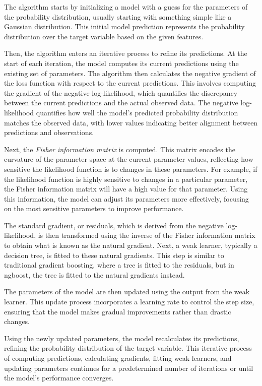 The algorithm starts by initializing a model with a guess for the parameters of the probability distribution, usually starting with something simple like a Gaussian distribution.
This initial model prediction represents the probability distribution over the target variable based on the given features.

Then, the algorithm enters an iterative process to refine its predictions.
At the start of each iteration, the model computes its current predictions using the existing set of parameters.
The algorithm then calculates the negative gradient of the loss function with respect to the current predictions.
This involves computing the gradient of the negative log-likelihood, which quantifies the discrepancy between the current predictions and the actual observed data.
The negative log-likelihood quantifies how well the model's predicted probability distribution matches the observed data, with lower values indicating better alignment between predictions and observations. 

Next, the \textit{Fisher information matrix} is computed. 
This matrix encodes the curvature of the parameter space at the current parameter values, reflecting how sensitive the likelihood function is to changes in these parameters.
For example, if the likelihood function is highly sensitive to changes in a particular parameter, the Fisher information matrix will have a high value for that parameter.
Using this information, the model can adjust its parameters more effectively, focusing on the most sensitive parameters to improve performance.

The standard gradient, or residuals, which is derived from the negative log-likelihood, is then transformed using the inverse of the Fisher information matrix to obtain what is known as the natural gradient.
Next, a weak learner, typically a decision tree, is fitted to these natural gradients.
This step is similar to traditional gradient boosting, where a tree is fitted to the residuals, but in \gls{ngboost}, the tree is fitted to the natural gradients instead.

The parameters of the model are then updated using the output from the weak learner.
This update process incorporates a learning rate to control the step size, ensuring that the model makes gradual improvements rather than drastic changes.

Using the newly updated parameters, the model recalculates its predictions, refining the probability distribution of the target variable. 
This iterative process of computing predictions, calculating gradients, fitting weak learners, and updating parameters continues for a predetermined number of iterations or until the model's performance converges.

